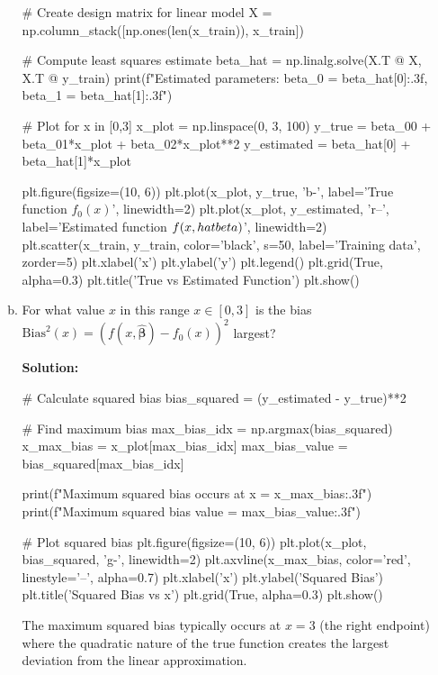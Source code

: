 \documentclass[11pt]{article}
\def\betabfhat{{\widehat{\bm{\beta}}}}
\begin{document}
\begin{enumerate}
\begin{enumerate}[(a)]
\begin{python}
# Create design matrix for linear model
X = np.column_stack([np.ones(len(x_train)), x_train])

# Compute least squares estimate
beta_hat = np.linalg.solve(X.T @ X, X.T @ y_train)
print(f"Estimated parameters: beta_0 = {beta_hat[0]:.3f}, beta_1 = {beta_hat[1]:.3f}")

# Plot for x in [0,3]
x_plot = np.linspace(0, 3, 100)
y_true = beta_00 + beta_01*x_plot + beta_02*x_plot**2
y_estimated = beta_hat[0] + beta_hat[1]*x_plot

plt.figure(figsize=(10, 6))
plt.plot(x_plot, y_true, 'b-', label='True function $f_0(x)$', linewidth=2)
plt.plot(x_plot, y_estimated, 'r--', label='Estimated function $f(x,\\hat{\\beta})$', linewidth=2)
plt.scatter(x_train, y_train, color='black', s=50, label='Training data', zorder=5)
plt.xlabel('x')
plt.ylabel('y')
plt.legend()
plt.grid(True, alpha=0.3)
plt.title('True vs Estimated Function')
plt.show()
\end{python}

\item For what value $x$ in this range $x \in [0,3]$ is the bias
$\mathrm{Bias}^2(x) = (f(x,\betabfhat)-f_0(x))^2$ largest?

\textbf{Solution:}
\begin{python}
# Calculate squared bias
bias_squared = (y_estimated - y_true)**2

# Find maximum bias
max_bias_idx = np.argmax(bias_squared)
x_max_bias = x_plot[max_bias_idx]
max_bias_value = bias_squared[max_bias_idx]

print(f"Maximum squared bias occurs at x = {x_max_bias:.3f}")
print(f"Maximum squared bias value = {max_bias_value:.3f}")

# Plot squared bias
plt.figure(figsize=(10, 6))
plt.plot(x_plot, bias_squared, 'g-', linewidth=2)
plt.axvline(x_max_bias, color='red', linestyle='--', alpha=0.7)
plt.xlabel('x')
plt.ylabel('Squared Bias')
plt.title('Squared Bias vs x')
plt.grid(True, alpha=0.3)
plt.show()
\end{python}

The maximum squared bias typically occurs at $x = 3$ (the right endpoint) where the quadratic nature of the true function creates the largest deviation from the linear approximation.

\end{enumerate}



\end{enumerate}
\end{document}
